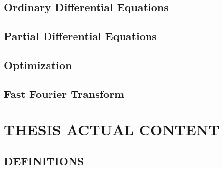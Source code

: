 \documentclass[12pt]{report}
\begin{document}
\section{Ordinary Differential Equations}

\section{Partial Differential Equations}

\section{Optimization}

\section{Fast Fourier Transform}

\newpage
\chapter{THESIS ACTUAL CONTENT}

\section{DEFINITIONS}
\end{document}
